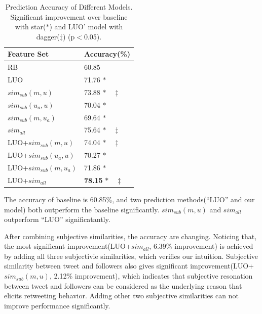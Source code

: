\documentclass[letterpaper]{article}
\begin{document}
\begin{table}[h]
\centering
\caption{Prediction Accuracy of Different Models. Significant improvement over baseline with star($ \ast $) and LUO' model with dagger($ \ddagger $) (p$ < $0.05).}
\label{tab4}
\begin{tabular}{|l|l|}
\hline
Feature Set & Accuracy(\%) \\
\hline
RB & 60.85  \\
LUO & 71.76 $ \ast  $\\
$ sim_{sub} \left( m,u \right) $ & 73.88 $ \ast \quad \ddagger $\\
$ sim_{sub}\left( u_{a},u \right)  $ & 70.04 $ \ast  $\\
$ sim_{sub}\left( m,u_{a} \right)  $ &69.64 $ \ast  $\\
$ sim_{all}  $ & 75.64 $ \ast  \quad \ddagger $\\
LUO+$ sim_{sub} \left( m,u \right)$ & 74.04  $ \ast \quad \ddagger $ \\
LUO+$ sim_{sub}\left( u_{a},u \right)$ & 70.27  $ \ast $ \\
LUO+$ sim_{sub}\left( m,u_{a} \right)$ & 71.86  $ \ast $ \\
LUO+$ sim_{all}  $ & \textbf{78.15}  $ \ast \quad \ddagger $ \\
\hline
\end{tabular}
\end{table}

The accuracy of baseline is 60.85\%, and two prediction methods(``LUO'' and our model) both outperform the baseline significantly. 
$ sim_{sub} \left( m,u \right) $ and $ sim_{all}  $ outperform ``LUO'' significatantly.

After combining subjective similarities, the accuracy are changing. 
Noticing that, the most significant improvement(LUO+$ sim_{all}  $, 6.39\% improvement) is achieved by adding all three subjectivie similarities, which verifies our intuition. 
Subjective similarity between tweet and followers also gives significant improvement(LUO+$ sim_{sub} \left( m,u \right) $, 2.12\% improvement), which indicates that subjective resonation between tweet and followers can be considered as the underlying reason that elicits retweeting behavior. 
Adding other two subjective similarities can not improve performance significantly.
\end{document}
